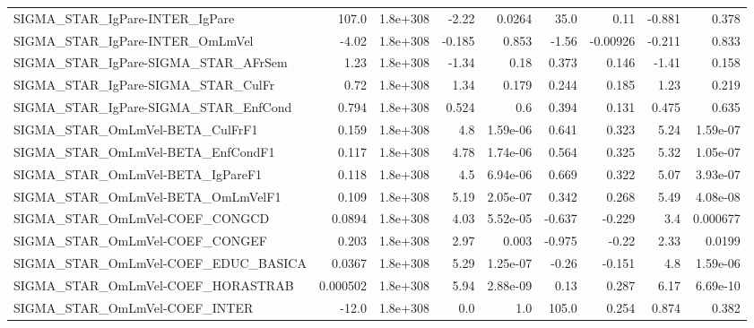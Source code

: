 \begin{tabular}{lrrrrrrrr}
SIGMA\_STAR\_IgPare-INTER\_IgPare        &       107.0 &     1.8e+308 &   -2.22 &   0.0264 &       35.0 &        0.11 &       -0.881 &         0.378 \\
SIGMA\_STAR\_IgPare-INTER\_OmLmVel       &       -4.02 &     1.8e+308 &  -0.185 &    0.853 &      -1.56 &    -0.00926 &       -0.211 &         0.833 \\
SIGMA\_STAR\_IgPare-SIGMA\_STAR\_AFrSem   &        1.23 &     1.8e+308 &   -1.34 &     0.18 &      0.373 &       0.146 &        -1.41 &         0.158 \\
SIGMA\_STAR\_IgPare-SIGMA\_STAR\_CulFr    &        0.72 &     1.8e+308 &    1.34 &    0.179 &      0.244 &       0.185 &         1.23 &         0.219 \\
SIGMA\_STAR\_IgPare-SIGMA\_STAR\_EnfCond  &       0.794 &     1.8e+308 &   0.524 &      0.6 &      0.394 &       0.131 &        0.475 &         0.635 \\
SIGMA\_STAR\_OmLmVel-BETA\_CulFrF1       &       0.159 &     1.8e+308 &     4.8 & 1.59e-06 &      0.641 &       0.323 &         5.24 &      1.59e-07 \\
SIGMA\_STAR\_OmLmVel-BETA\_EnfCondF1     &       0.117 &     1.8e+308 &    4.78 & 1.74e-06 &      0.564 &       0.325 &         5.32 &      1.05e-07 \\
SIGMA\_STAR\_OmLmVel-BETA\_IgPareF1      &       0.118 &     1.8e+308 &     4.5 & 6.94e-06 &      0.669 &       0.322 &         5.07 &      3.93e-07 \\
SIGMA\_STAR\_OmLmVel-BETA\_OmLmVelF1     &       0.109 &     1.8e+308 &    5.19 & 2.05e-07 &      0.342 &       0.268 &         5.49 &      4.08e-08 \\
SIGMA\_STAR\_OmLmVel-COEF\_CONGCD        &      0.0894 &     1.8e+308 &    4.03 & 5.52e-05 &     -0.637 &      -0.229 &          3.4 &      0.000677 \\
SIGMA\_STAR\_OmLmVel-COEF\_CONGEF        &       0.203 &     1.8e+308 &    2.97 &    0.003 &     -0.975 &       -0.22 &         2.33 &        0.0199 \\
SIGMA\_STAR\_OmLmVel-COEF\_EDUC\_BASICA   &      0.0367 &     1.8e+308 &    5.29 & 1.25e-07 &      -0.26 &      -0.151 &          4.8 &      1.59e-06 \\
SIGMA\_STAR\_OmLmVel-COEF\_HORASTRAB     &    0.000502 &     1.8e+308 &    5.94 & 2.88e-09 &       0.13 &       0.287 &         6.17 &      6.69e-10 \\
SIGMA\_STAR\_OmLmVel-COEF\_INTER         &       -12.0 &     1.8e+308 &     0.0 &      1.0 &      105.0 &       0.254 &        0.874 &         0.382 \\

\end{tabular}
